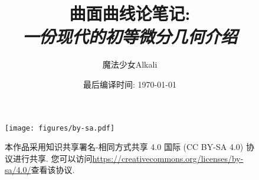 \documentclass[11pt]{book}
\title{曲面曲线论笔记:\\{\itshape\Large 一份现代的初等微分几何介绍}}
\author{魔法少女Alkali}
\affil{北京师范大学数学科学学院}
\date{最后编译时间: \today}
\numberwithin{equation}{section}
\begin{document}
    \maketitle
    \vspace*{13cm}
    \thispagestyle{empty}
    \begin{figure}[ht]
        \texttt{[image: figures/by-sa.pdf]}\hspace{0.05\textwidth}
        \begin{minipage}[b]{0.54\textwidth} %
        \small
        本作品采用知识共享署名-相同方式共享 4.0 国际 (CC BY-SA 4.0) 协议进行共享.
        您可以访问\url{https://creativecommons.org/licenses/by-sa/4.0/}查看该协议.
        \end{minipage}
    \end{figure}

    \frontmatter
    

    \tableofcontents

    \mainmatter
    
    
    
    
    

    \appendix
    \printbibliography[title={参考文献},heading=bibintoc]
\end{document}
